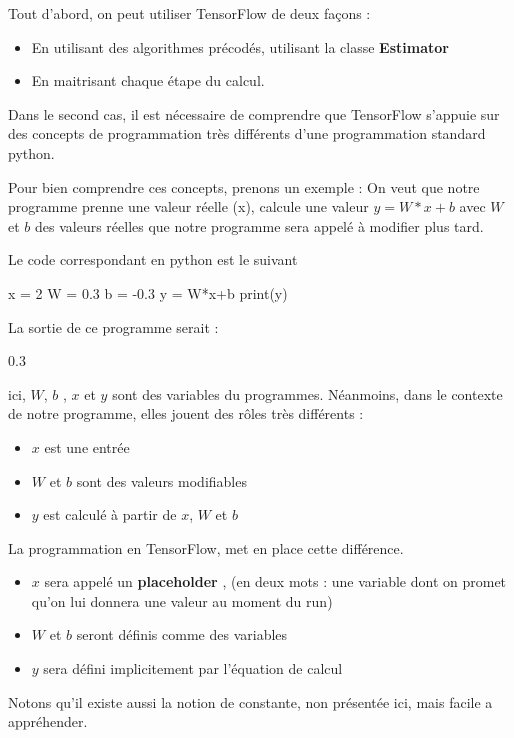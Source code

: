 \documentclass[a4paper,11pt]{book}
\begin{document}
Tout d'abord, on peut utiliser TensorFlow de deux façons :
\begin{itemize}
\item En utilisant des algorithmes précodés, utilisant la classe \textbf{Estimator}
\item En maitrisant chaque étape du calcul.
\end{itemize}

Dans le second cas, il est nécessaire de comprendre que TensorFlow
s'appuie sur des concepts de programmation très différents d'une programmation standard python.

Pour bien comprendre ces concepts, prenons un exemple :
On veut que notre programme prenne une valeur réelle (x), calcule une valeur  $y = W*x+b$ avec $W$ et $b$ des valeurs réelles que notre programme sera appelé à modifier plus tard.

Le code correspondant en python est le suivant
\begin{mypython}
x = 2
W = 0.3
b = -0.3
y = W*x+b
print(y)
\end{mypython}

La sortie de ce programme serait :
\begin{myoutput}
0.3
\end{myoutput}

ici, $W$, $b$ , $x$ et $y$ sont des variables du programmes.
Néanmoins, dans le contexte de notre programme, elles jouent des rôles très différents :
\begin{itemize}
\item $x$ est une entrée 
\item $W$ et $b$ sont des valeurs modifiables
\item $y$ est calculé à partir de $x$, $W$ et $b$
\end{itemize}

La programmation en TensorFlow, met en place cette différence.
\begin{itemize}
\item $x$ sera appelé un \textbf{placeholder} , (en deux mots : une variable dont on promet qu'on lui donnera une valeur au moment du run)
\item $W$ et $b$ seront définis comme des variables
\item $y$ sera défini implicitement par l'équation de calcul 
\end{itemize}

Notons qu'il existe aussi la notion de constante, non présentée ici, mais facile a appréhender.
\end{document}
